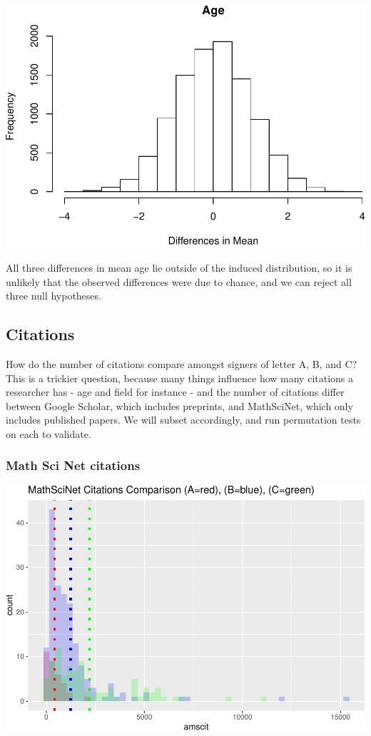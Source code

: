 \documentclass[]{article}
\begin{document}
\includegraphics{final_files/figure-latex/unnamed-chunk-24-1.pdf}

All three differences in mean age lie outside of the induced
distribution, so it is unlikely that the observed differences were due
to chance, and we can reject all three null hypotheses.

\hypertarget{citations}{%
\subsection{Citations}\label{citations}}

How do the number of citations compare amongst signers of letter A, B,
and C? This is a trickier question, because many things influence how
many citations a researcher has - age and field for instance - and the
number of citations differ between Google Scholar, which includes
preprints, and MathSciNet, which only includes published papers. We will
subset accordingly, and run permutation tests on each to validate.

\hypertarget{math-sci-net-citations}{%
\subsubsection{Math Sci Net citations}\label{math-sci-net-citations}}

\includegraphics{final_files/figure-latex/unnamed-chunk-25-1.pdf}
\end{document}

